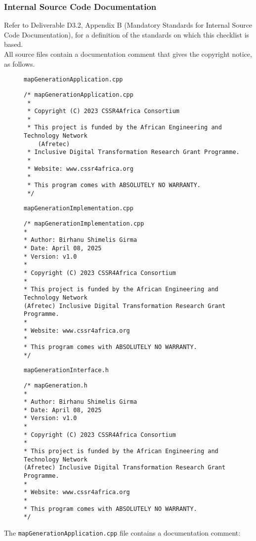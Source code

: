 \documentclass{CSSRforAfrica}
\newcommand{\blank}{~\\}
\newcommand{\checkboxChecked}{\fbox{\ding{51}}} %
\begin{document}
 
 
\subsubsection{Internal Source Code Documentation}
\label{subsubsection:map_generation_documentation_standards}  
 
Refer to Deliverable D3.2, Appendix B (Mandatory Standards for Internal Source Code Documentation), for a definition of the standards on which this checklist is based.\\

\noindent All source files contain a documentation comment that gives the copyright notice, as follows.
 
\begin{description}

\item[\checkboxChecked] {\small \verb+mapGenerationApplication.cpp+}  
{\small \begin{verbatim}
/* mapGenerationApplication.cpp
 *
 * Copyright (C) 2023 CSSR4Africa Consortium
 * 
 * This project is funded by the African Engineering and Technology Network 
    (Afretec) 
 * Inclusive Digital Transformation Research Grant Programme. 
 *
 * Website: www.cssr4africa.org
 *
 * This program comes with ABSOLUTELY NO WARRANTY.
 */
\end{verbatim} }

\item[\checkboxChecked]  {\small \verb+mapGenerationImplementation.cpp+}  
{\small \begin{verbatim}
/* mapGenerationImplementation.cpp
*
* Author: Birhanu Shimelis Girma
* Date: April 08, 2025
* Version: v1.0
*
* Copyright (C) 2023 CSSR4Africa Consortium
*
* This project is funded by the African Engineering and Technology Network 
(Afretec) Inclusive Digital Transformation Research Grant Programme.
*
* Website: www.cssr4africa.org
*
* This program comes with ABSOLUTELY NO WARRANTY.
*/
\end{verbatim} }


\newpage
\item[\checkboxChecked] {\small \verb+mapGenerationInterface.h+}   
{\small \begin{verbatim}
/* mapGeneration.h
*
* Author: Birhanu Shimelis Girma
* Date: April 08, 2025
* Version: v1.0
*
* Copyright (C) 2023 CSSR4Africa Consortium
*
* This project is funded by the African Engineering and Technology Network 
(Afretec) Inclusive Digital Transformation Research Grant Programme.
*
* Website: www.cssr4africa.org
*
* This program comes with ABSOLUTELY NO WARRANTY.
*/
\end{verbatim} }


\end{description} 
%
\noindent The {\small \verb+mapGenerationApplication.cpp+} file contains a documentation comment:
\end{document}
